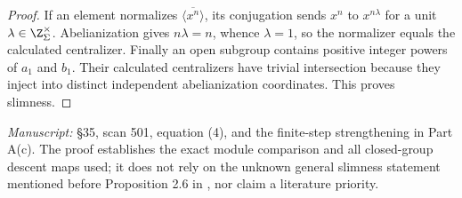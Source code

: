 \begin{proof}
If an element normalizes $\overline{\langle x^n\rangle}$, its conjugation sends $x^n$ to $x^{n\lambda}$ for a unit $\lambda\in\Z_\Sigma^\times$. Abelianization gives $n\lambda=n$, whence $\lambda=1$, so the normalizer equals the calculated centralizer. Finally an open subgroup contains positive integer powers of $a_1$ and $b_1$. Their calculated centralizers have trivial intersection because they inject into distinct independent abelianization coordinates. This proves slimness.
\end{proof}
\noindent\emph{Manuscript:} \S35, scan 501, equation (4), and the finite-step strengthening in Part A(c). The proof establishes the exact module comparison and all closed-group descent maps used; it does not rely on the unknown general slimness statement mentioned before Proposition 2.6 in \cite{A_Yamaguchi2026}, nor claim a literature priority.

